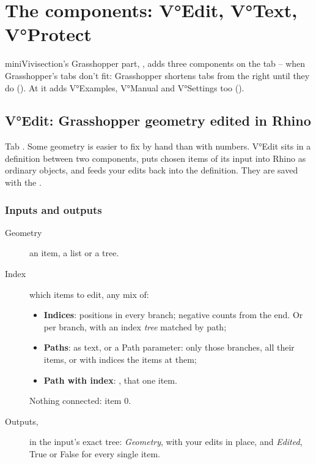 \chapter{The components: V°Edit, V°Text, V°Protect}\label{ch:ghcomponents}

miniVivisection's Grasshopper part, , adds three components on the tab
 --  when Grasshopper's tabs don't fit: Grasshopper shortens tabs from the right
until they do (). At  it
adds V°Examples, V°Manual and V°Settings too ().

\section{V°Edit: Grasshopper geometry edited in Rhino}\label{sec:vedit}

Tab . Some geometry is easier to fix by hand than with numbers. V°Edit sits in a
definition between two components, puts chosen items of its input into Rhino as ordinary objects, and feeds your
edits back into the definition. They are saved with the .


\subsection{Inputs and outputs}

\begin{description}
  \item[Geometry] an item, a list or a tree.
  \item[Index] which items to edit, any mix of:
    \begin{itemize}
      \item \textbf{Indices}: positions in every branch; negative counts from the end. Or per branch, with an index
            \emph{tree} matched by path;
      \item \textbf{Paths}:  as text, or a Path parameter: only those branches, all their items, or with
            indices the items at them;
      \item \textbf{Path with index}: , that one item.
    \end{itemize}
    Nothing connected: item 0.
  \item[Outputs,] in the input's exact tree: \emph{Geometry}, with your edits in place, and \emph{Edited}, True or False
        for every single item.
\end{description}

